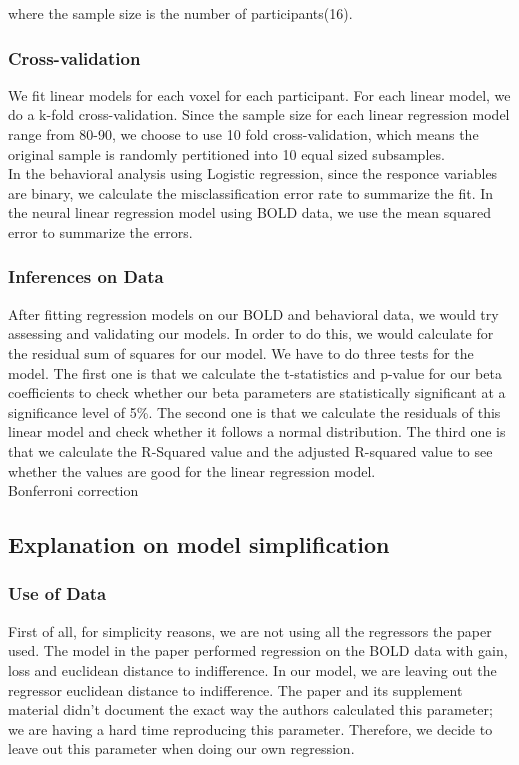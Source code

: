 where the sample size is the number of participants(16).

\subsubsection{Cross-validation}

We fit linear models for each voxel for each participant. For each linear
model, we do a k-fold cross-validation. Since the sample size for each linear 
regression model range from 80-90, we choose to use 10 fold cross-validation,
which means the original sample is randomly pertitioned into 10 equal sized 
subsamples. \\
In the behavioral analysis using Logistic regression, since the responce 
variables are binary, we calculate the misclassification error rate to 
summarize the fit. In the neural linear regression model using BOLD data, we 
use the mean squared error to summarize the errors.

\subsubsection{Inferences on Data}

After fitting regression models on our BOLD and behavioral data, we would try 
assessing and validating our models. In order to do this, we would calculate 
for the residual sum of squares for our model. We have to do three tests for 
the model. The first one is that we calculate the t-statistics and p-value for 
our beta coefficients to check whether our beta parameters are statistically 
significant at a significance level of 5\%. The second one is that we calculate
the residuals of this linear model and check whether it follows a normal 
distribution. The third one is that we calculate the R-Squared value and the 
adjusted R-squared value to see whether the values are good for the linear 
regression model.\\
Bonferroni correction


\subsection{Explanation on model simplification}

\subsubsection{Use of Data}
\indent \indent First of all, for simplicity reasons, we are not using all the 
regressors the paper used. The model in the paper performed regression on the 
BOLD data with gain, loss and euclidean distance to indifference. In our model,
we are leaving out the regressor euclidean distance to indifference. The paper 
and its supplement material didn't document the exact way the authors 
calculated this parameter; we are having a hard time reproducing this 
parameter. Therefore, we decide to leave out this parameter when doing our own 
regression.

